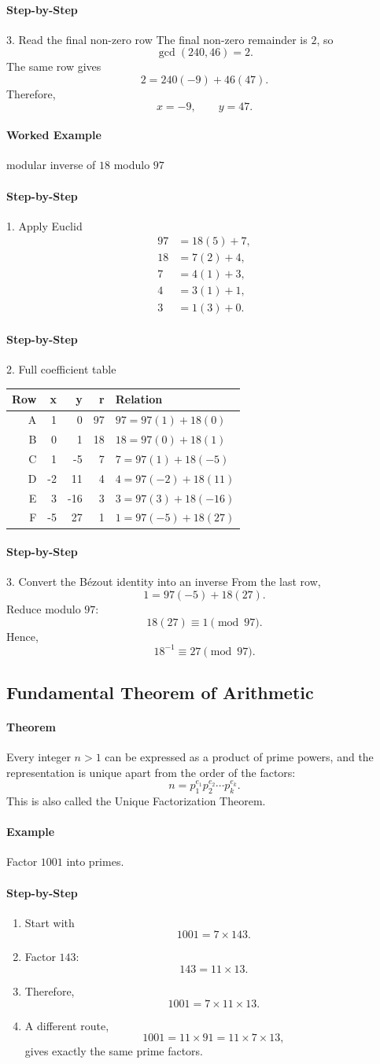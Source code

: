 \documentclass[12pt]{article}
\newcommand{\Step}{\paragraph{Step-by-Step}}
\newcommand{\Example}{\paragraph{Example}}
\newcommand{\Exam}{\paragraph{Worked Example}}
\newcommand{\Theorem}{\paragraph{Theorem}}
\begin{document}
\Step{3. Read the final non-zero row}
The final non-zero remainder is $2$, so
\[
\gcd(240,46)=2.
\]
The same row gives
\[
2=240(-9)+46(47).
\]
Therefore,
\[
x=-9,\qquad y=47.
\]

\Exam{modular inverse of $18$ modulo $97$}

\Step{1. Apply Euclid}
\begin{align*}
97&=18(5)+7,\\
18&=7(2)+4,\\
7&=4(1)+3,\\
4&=3(1)+1,\\
3&=1(3)+0.
\end{align*}

\Step{2. Full coefficient table}
\begin{table}[H]
\centering
\small
\begin{tabular}{r r r r l}
\toprule
Row & x & y & r & Relation\\
\midrule
A & 1 & 0 & 97 & $97=97(1)+18(0)$\\
B & 0 & 1 & 18 & $18=97(0)+18(1)$\\
C & 1 & -5 & 7 & $7=97(1)+18(-5)$\\
D & -2 & 11 & 4 & $4=97(-2)+18(11)$\\
E & 3 & -16 & 3 & $3=97(3)+18(-16)$\\
F & -5 & 27 & 1 & $1=97(-5)+18(27)$\\
\bottomrule
\end{tabular}
\end{table}

\Step{3. Convert the Bézout identity into an inverse}
From the last row,
\[
1=97(-5)+18(27).
\]
Reduce modulo $97$:
\[
18(27)\equiv1\pmod{97}.
\]
Hence,
\[
\boxed{18^{-1}\equiv27\pmod{97}}.
\]

\subsection{Fundamental Theorem of Arithmetic}
\Theorem Every integer $n>1$ can be expressed as a product of prime powers, and the representation is unique apart from the order of the factors:
\[
n=p_1^{e_1}p_2^{e_2}\cdots p_k^{e_k}.
\]
This is also called the Unique Factorization Theorem.

\Example Factor $1001$ into primes.

\Step
\begin{enumerate}
    \item Start with
    \[
    1001=7\times143.
    \]
    \item Factor $143$:
    \[
    143=11\times13.
    \]
    \item Therefore,
    \[
    1001=7\times11\times13.
    \]
    \item A different route,
    \[
    1001=11\times91=11\times7\times13,
    \]
    gives exactly the same prime factors.
\end{enumerate}
\end{document}
